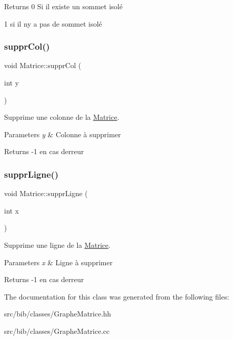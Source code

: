 \begin{DoxyReturn}{Returns}
0 Si il existe un sommet isol\'{e} 

1 si il n\textquotesingle{}y a pas de sommet isol\'{e} 
\end{DoxyReturn}
\mbox{\label{classMatrice_aa4982a33761373959e32f10fc186abfc}} 
\subsubsection{\texorpdfstring{suppr\+Col()}{supprCol()}}
{\footnotesize\ttfamily void Matrice\+::suppr\+Col (\begin{DoxyParamCaption}\item[{int}]{y }\end{DoxyParamCaption})}



Supprime une colonne de la \hyperlink{classMatrice}{Matrice}. 


\begin{DoxyParams}{Parameters}
{\em y} & Colonne \`{a} supprimer \\
\hline
\end{DoxyParams}
\begin{DoxyReturn}{Returns}
-\/1 en cas d\textquotesingle{}erreur 
\end{DoxyReturn}
\mbox{\label{classMatrice_ad6527495003ed48bc6f3276f07c8cf72}} 
\subsubsection{\texorpdfstring{suppr\+Ligne()}{supprLigne()}}
{\footnotesize\ttfamily void Matrice\+::suppr\+Ligne (\begin{DoxyParamCaption}\item[{int}]{x }\end{DoxyParamCaption})}



Supprime une ligne de la \hyperlink{classMatrice}{Matrice}. 


\begin{DoxyParams}{Parameters}
{\em x} & Ligne \`{a} supprimer \\
\hline
\end{DoxyParams}
\begin{DoxyReturn}{Returns}
-\/1 en cas d\textquotesingle{}erreur 
\end{DoxyReturn}


The documentation for this class was generated from the following files\+:\begin{DoxyCompactItemize}
\item 
src/bib/classes/Graphe\+Matrice.\+hh\item 
src/bib/classes/Graphe\+Matrice.\+cc\end{DoxyCompactItemize}
